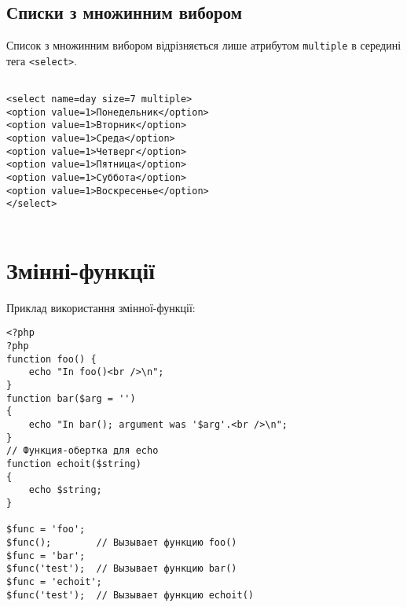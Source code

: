 \subsection*{Списки з множинним вибором}
Список з множинним вибором відрізняється лише атрибутом \verb'multiple' в середині тега \verb'<select>'.
\begin{verbatim}

<select name=day size=7 multiple>
<option value=1>Понедельник</option>
<option value=1>Вторник</option>
<option value=1>Среда</option>
<option value=1>Четверг</option>
<option value=1>Пятница</option>
<option value=1>Суббота</option>
<option value=1>Воскресенье</option>
</select>


\end{verbatim}


\section{Змінні-функції}
\label{var-func:app}
Приклад використання змінної-функції:
\begin{verbatim}
<?php
?php
function foo() {
    echo "In foo()<br />\n";
}
function bar($arg = '')
{
    echo "In bar(); argument was '$arg'.<br />\n";
}
// Функция-обертка для echo
function echoit($string)
{
    echo $string;
}

$func = 'foo';
$func();        // Вызывает функцию foo()
$func = 'bar';
$func('test');  // Вызывает функцию bar()
$func = 'echoit';
$func('test');  // Вызывает функцию echoit()
\end{verbatim}